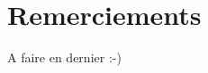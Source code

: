 \documentclass[a4paper,11pt,twoside]{book}
\begin{document}
    
    \cleardoublepage
    \section*{Remerciements}
    A faire en dernier :-)
    \tableofcontents
    \mainmatter
    
    \appendix
    
    
    
\end{document}

